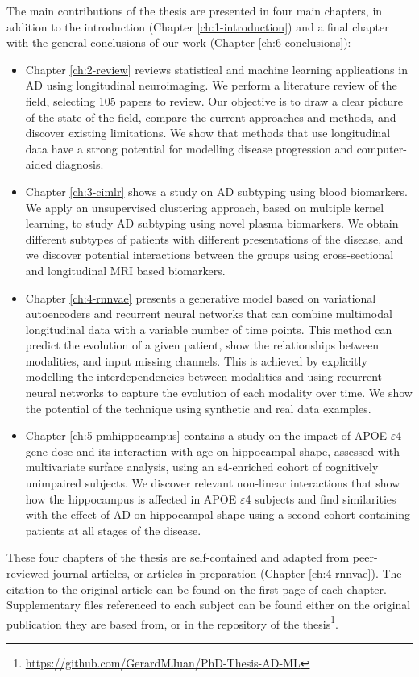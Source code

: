 The main contributions of the thesis are presented in four main chapters, in addition to the introduction (Chapter \ref{ch:1-introduction}) and a final chapter with the general conclusions of our work (Chapter \ref{ch:6-conclusions}):

\begin{itemize}
    \item Chapter \ref{ch:2-review} reviews statistical and machine learning applications in AD using longitudinal neuroimaging. We perform a literature review of the field, selecting 105 papers to review. Our objective is to draw a clear picture of the state of the field, compare the current approaches and methods, and discover existing limitations. We show that methods that use longitudinal data have a strong potential for modelling disease progression and computer-aided diagnosis. 
    \item Chapter \ref{ch:3-cimlr} shows a study on AD subtyping using blood biomarkers. We apply an unsupervised clustering approach, based on multiple kernel learning, to study AD subtyping using novel plasma biomarkers. We obtain different subtypes of patients with different presentations of the disease, and we discover potential interactions between the groups using cross-sectional and longitudinal MRI based biomarkers.
    \item Chapter \ref{ch:4-rnnvae} presents a generative model based on variational autoencoders and recurrent neural networks that can combine multimodal longitudinal data with a variable number of time points. This method can predict the evolution of a given patient, show the relationships between modalities, and input missing channels. This is achieved by explicitly modelling the interdependencies between modalities and using recurrent neural networks to capture the evolution of each modality over time. We show the potential of the technique using synthetic and real data examples.
    \item Chapter \ref{ch:5-pmhippocampus} contains a study on the impact of APOE $\varepsilon$4 gene dose and its interaction with age on hippocampal shape, assessed with multivariate surface analysis, using an $\varepsilon$4-enriched cohort of cognitively unimpaired subjects. We discover relevant non-linear interactions that show how the hippocampus is affected in APOE $\varepsilon$4 subjects and find similarities with the effect of AD on hippocampal shape using a second cohort containing patients at all stages of the disease.
\end{itemize}

These four chapters of the thesis are self-contained and adapted from peer-reviewed journal articles, or articles in preparation (Chapter \ref{ch:4-rnnvae}). The citation to the original article can be found on the first page of each chapter. Supplementary files referenced to each subject can be found either on the original publication they are based from, or in the repository of the thesis\footnote{\url{https://github.com/GerardMJuan/PhD-Thesis-AD-ML}}.